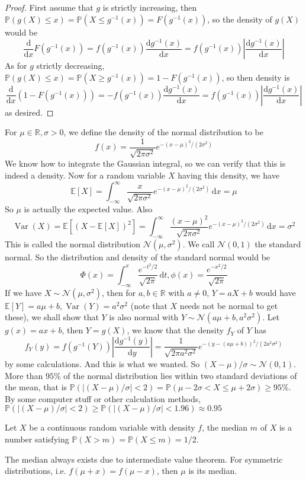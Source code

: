 \begin{proof}
    First assume that $g$ is strictly increasing, then $\mathbb P(g(X)\le x)=\mathbb P(X\le g^{-1}(x))=F(g^{-1}(x))$, so the density of $g(X)$ would be
    $$\frac{\mathrm d}{\mathrm dx}F(g^{-1}(x))=f(g^{-1}(x))\frac{\mathrm dg^{-1}(x)}{\mathrm dx}=f(g^{-1}(x))\left|\frac{\mathrm dg^{-1}(x)}{\mathrm dx}\right|$$
    As for $g$ strictly decreasing, $\mathbb P(g(X)\le x)=\mathbb P(X\ge g^{-1}(x))=1-F(g^{-1}(x))$, so then density is
    $$\frac{\mathrm d}{\mathrm dx}(1-F(g^{-1}(x)))=-f(g^{-1}(x))\frac{\mathrm dg^{-1}(x)}{\mathrm dx}=f(g^{-1}(x))\left|\frac{\mathrm dg^{-1}(x)}{\mathrm dx}\right|$$
    as desired.
\end{proof}
\begin{example}
    For $\mu\in\mathbb R,\sigma>0$, we define the density of the normal distribution to be
    $$f(x)=\frac{1}{\sqrt{2\pi\sigma^2}}e^{-(x-\mu)^2/(2\sigma^2)}$$
    We know how to integrate the Gaussian integral, so we can verify that this is indeed a density.
    Now for a random variable $X$ having this density, we have
    $$\mathbb E[X]=\int_{-\infty}^\infty \frac{x}{\sqrt{2\pi\sigma^2}}e^{-(x-\mu)^2/(2\sigma^2)}\,\mathrm dx=\mu$$
    So $\mu$ is actually the expected value.
    Also
    $$\operatorname{Var}(X)=\mathbb E[(X-\mathbb E[X])^2]=\int_{-\infty}^\infty \frac{(x-\mu)^2}{\sqrt{2\pi\sigma^2}}e^{-(x-\mu)^2/(2\sigma^2)}\,\mathrm dx=\sigma^2$$
    This is called the normal distribution $\mathcal N(\mu,\sigma^2)$.
    We call $\mathcal N(0,1)$ the standard normal.
    So the distribution and density of the standard normal would be
    $$\Phi(x)=\int_{-\infty}^x\frac{e^{-t^2/2}}{\sqrt{2\pi}}\,\mathrm dt,\phi(x)=\frac{e^{-x^2/2}}{\sqrt{2\pi}}$$
    If we have $X\sim\mathcal N(\mu,\sigma^2)$, then for $a,b\in\mathbb R$ with $a\neq 0$, $Y=aX+b$ would have $\mathbb E[Y]=a\mu+b,\operatorname{Var}(Y)=a^2\sigma^2$ (note that $X$ needs not be normal to get these), we shall show that $Y$ is also normal with $Y\sim\mathcal N(a\mu+b,a^2\sigma^2)$.
    Let $g(x)=ax+b$, then $Y=g(X)$, we know that the density $f_Y$ of $Y$ has
    $$f_Y(y)=f(g^{-1}(Y))\left|\frac{\mathrm dg^{-1}(y)}{\mathrm dy}\right|=\frac{1}{\sqrt{2\pi a^2\sigma^2}}e^{-(y-(a\mu+b))^2/(2a^2\sigma^2)}$$
    by some calculations.
    And this is what we wanted.
    So $(X-\mu)/\sigma\sim\mathcal N(0,1)$.
    More than $95\%$ of the normal distribution lies within two standard deviations of the mean, that is $\mathbb P(|(X-\mu)/\sigma|<2)=\mathbb P(\mu-2\sigma<X\le \mu+2\sigma)\ge 95\%$.
    By some computer stuff or other calculation methods, $\mathbb P(|(X-\mu)/\sigma|<2)\ge \mathbb P(|(X-\mu)/\sigma|<1.96)\approx 0.95$
\end{example}
\begin{definition}
    Let $X$ be a continuous random variable with density $f$, the median $m$ of $X$ is a number satisfying $\mathbb P(X>m)=\mathbb P(X\le m)=1/2$.
\end{definition}
The median always exists due to intermediate value theorem.
For symmetric distributions, i.e. $f(\mu+x)=f(\mu-x)$, then $\mu$ is its median.
